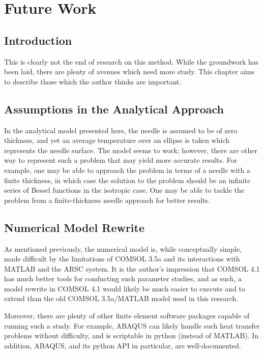 \chapter{Future Work}

\section{Introduction}

This is clearly not the end of research on this method. While the groundwork has
been laid, there are plenty of avenues which need more study. This chapter aims
to describe those which the author thinks are important.

\section{Assumptions in the Analytical Approach}

In the analytical model presented here, the needle is assumed to be of zero
thickness, and yet an average temperature over an ellipse is taken which
represents the needle surface.  The model seems to work; however, there are
other way to represent such a problem that may yield more accurate results. For
example, one may be able to approach the problem in terms of a needle with a
finite thickness, in which case the solution to the problem should be an
infinite series of Bessel functions in the isotropic case. One may be able to
tackle the problem from a finite-thickness needle approach for better results.

\section{Numerical Model Rewrite}

As mentioned previously, the numerical model is, while conceptually simple, made
difficult by the limitations of COMSOL 3.5a and its interactions with MATLAB and
the ARSC system.  It is the author's impression that COMSOL 4.1 has much better
tools for conducting such parameter studies, and as such, a model rewrite in
COMSOL 4.1 would likely be much easier to execute and to extend than the old
COMSOL 3.5a/MATLAB model used in this research.

Moreover, there are plenty of other finite element software packages capable of
running such a study. For example, ABAQUS can likely handle such heat transfer
problems without difficulty, and is scriptable in python (instead of MATLAB).
In addition, ABAQUS, and its python API in particular, are well-documented.

